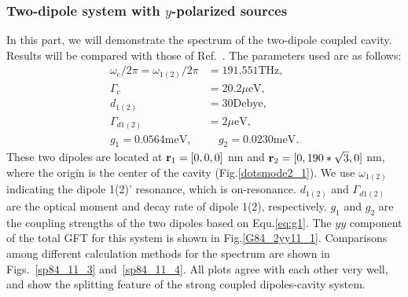 \subsubsection{Two-dipole system with $y$-polarized sources}
In this part, we will demonstrate the spectrum of the two-dipole coupled cavity.
Results will be compared with those of Ref.~\cite{Yao2009c}.
The parameters used are as follows:
\begin{align}
 \omega_c/2\pi = \omega_{1(2)}/2\pi &= 191.551 {\text {THz}},\\
 \Gamma_c &= 20.2 \mu{\text {eV}}, \\
 d_{1(2)} &= 30 {\text {Debye}}, \\
 \Gamma_{d1(2)} &= 2 \mu{\text {eV}}, \\
 g_1 = 0.0564 {\text {meV}}, &\quad g_2=0.0230 {\text {meV}}.
\end{align}
These two dipoles are located at $\mathbf{r}_1=[0,0,0]$ nm and $\mathbf{r}_2=[0,190*\sqrt{3},0]$ nm, where the origin is the center of the cavity (Fig.\ref{dotsmode2_1}). We use $\omega_{1 (2)}$ indicating the dipole 1(2)' resonance, which is on-resonance. $d_{1(2)}$ and $\Gamma_{d1(2)}$ are the optical moment and decay rate of dipole 1(2), respectively. $g_1$ and $g_2$ are the coupling strengths of the two dipoles based on Equ.\eqref{eq:g1}. The $yy$ component of the total GFT for this system is shown in Fig.\ref{G84_2yy11_1}. Comparisons among different calculation methods for the spectrum are shown in Figs.~\ref{sp84_11_3} and~\ref{sp84_11_4}. All plots agree with each other very well, and show the splitting feature of the strong coupled dipoles-cavity system.

